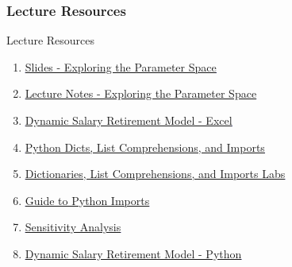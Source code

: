 \documentclass[handout, 11pt]{beamer}
\begin{document}
\appendix
{}
\setcounter{finalframe}{\value{framenumber}}
\begin{frame}
\frametitle{Lecture Resources}
{
\begin{block}{Lecture Resources}
\begin{enumerate}
\item \textcolor{blue}{\underline{\href{https://nickderobertis.github.io/fin-model-course/\_static/generated/pdfs/S7 Exploring the Parameter Space.pdf}{Slides - Exploring the Parameter Space}}}
\item \textcolor{blue}{\underline{\href{https://nickderobertis.github.io/fin-model-course/\_static/generated/pdfs/LN7 Exploring the Parameter Space.pdf}{Lecture Notes - Exploring the Parameter Space}}}
\item \textcolor{blue}{\underline{\href{https://nickderobertis.github.io/fin-model-course/\_static/Examples/Introduction/Excel/Dynamic Salary Retirement Model.xlsx}{Dynamic Salary Retirement Model - Excel}}}
\item \textcolor{blue}{\underline{\href{https://nickderobertis.github.io/fin-model-course/\_static/Examples/Introduction/Python/Python Dicts, List comprehensions, and Imports.ipynb}{Python Dicts, List Comprehensions, and Imports}}}
\item \textcolor{blue}{\underline{\href{https://nickderobertis.github.io/fin-model-course/\_static/Materials for Lab Exercises/Python Basics/Dicts and List Comprehensions Lab.ipynb}{Dictionaries, List Comprehensions, and Imports Labs}}}
\item \textcolor{blue}{\underline{\href{https://realpython.com/absolute-vs-relative-python-imports/}{Guide to Python Imports}}}
\item \textcolor{blue}{\underline{\href{https://nickderobertis.github.io/fin-model-course/\_static/Examples/Sensitivity Analysis/Python/Sensitivity Analysis.ipynb}{Sensitivity Analysis}}}
\item \textcolor{blue}{\underline{\href{https://nickderobertis.github.io/fin-model-course/\_static/Examples/Introduction/Python/Dynamic Salary Retirement Model.ipynb}{Dynamic Salary Retirement Model - Python}}}
\end{enumerate}
\vfill
\end{block}
}
\label{frames:resources}
\end{frame}
\end{document}
